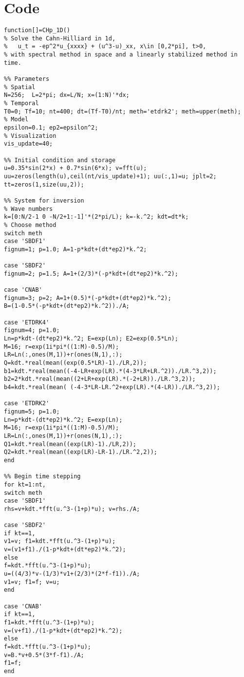 \chapter{Code}
\begin{verbatim}
function[]=CHp_1D()
% Solve the Cahn-Hilliard in 1d,
%   u_t = -ep^2*u_{xxxx} + (u^3-u)_xx, x\in [0,2*pi], t>0,
% with spectral method in space and a linearly stabilized method in time.

%% Parameters 
% Spatial 
N=256;  L=2*pi; dx=L/N; x=(1:N)'*dx;
% Temporal
T0=0; Tf=10; nt=400; dt=(Tf-T0)/nt; meth='etdrk2'; meth=upper(meth);
% Model
epsilon=0.1; ep2=epsilon^2; 
% Visualization
vis_update=40;

%% Initial condition and storage
u=0.35*sin(2*x) + 0.7*sin(6*x); v=fft(u);
uu=zeros(length(u),ceil(nt/vis_update)+1); uu(:,1)=u; jplt=2;
tt=zeros(1,size(uu,2));

%% System for inversion
% Wave numbers
k=[0:N/2-1 0 -N/2+1:-1]'*(2*pi/L); k=-k.^2; kdt=dt*k;
% Choose method
switch meth
case 'SBDF1'
fignum=1; p=1.0; A=1-p*kdt+(dt*ep2)*k.^2;

case 'SBDF2'
fignum=2; p=1.5; A=1+(2/3)*(-p*kdt+(dt*ep2)*k.^2);

case 'CNAB'
fignum=3; p=2; A=1+(0.5)*(-p*kdt+(dt*ep2)*k.^2); 
B=(1-0.5*(-p*kdt+(dt*ep2)*k.^2))./A;

case 'ETDRK4'
fignum=4; p=1.0; 
Ln=p*kdt-(dt*ep2)*k.^2; E=exp(Ln); E2=exp(0.5*Ln);
M=16; r=exp(1i*pi*((1:M)-0.5)/M);
LR=Ln(:,ones(M,1))+r(ones(N,1),:);
Q=kdt.*real(mean((exp(0.5*LR)-1)./LR,2));
b1=kdt.*real(mean((-4-LR+exp(LR).*(4-3*LR+LR.^2))./LR.^3,2));
b2=2*kdt.*real(mean((2+LR+exp(LR).*(-2+LR))./LR.^3,2));
b4=kdt.*real(mean( (-4-3*LR-LR.^2+exp(LR).*(4-LR))./LR.^3,2));

case 'ETDRK2'
fignum=5; p=1.0;
Ln=p*kdt-(dt*ep2)*k.^2; E=exp(Ln); 
M=16; r=exp(1i*pi*((1:M)-0.5)/M);
LR=Ln(:,ones(M,1))+r(ones(N,1),:);
Q1=kdt.*real(mean((exp(LR)-1)./LR,2));
Q2=kdt.*real(mean((exp(LR)-LR-1)./LR.^2,2)); 
end

%% Begin time stepping
for kt=1:nt,
switch meth
case 'SBDF1'
rhs=v+kdt.*fft(u.^3-(1+p)*u); v=rhs./A;

case 'SBDF2'
if kt==1, 
v1=v; f1=kdt.*fft(u.^3-(1+p)*u);
v=(v1+f1)./(1-p*kdt+(dt*ep2)*k.^2);
else 
f=kdt.*fft(u.^3-(1+p)*u); 
u=((4/3)*v-(1/3)*v1+(2/3)*(2*f-f1))./A; 
v1=v; f1=f; v=u;
end

case 'CNAB'
if kt==1,
f1=kdt.*fft(u.^3-(1+p)*u); 
v=(v+f1)./(1-p*kdt+(dt*ep2)*k.^2);
else
f=kdt.*fft(u.^3-(1+p)*u);
v=B.*v+0.5*(3*f-f1)./A;
f1=f; 
end


\end{verbatim}
